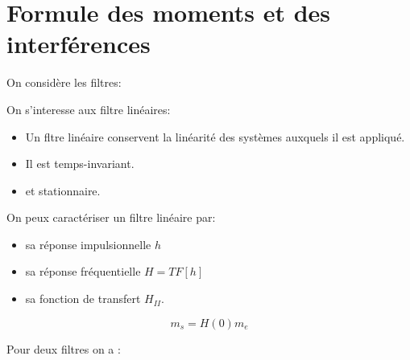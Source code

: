 \documentclass[main.tex]{subfiles}
\begin{document}
\section{Formule des moments et des interférences}
On considère les filtres:
{\huge
\begin{center}
\end{center}}

On s'interesse aux filtre linéaires:

\begin{defin}
    \begin{itemize}
    \item Un fltre linéaire conservent la linéarité des systèmes auxquels il est appliqué.
    \item  Il est temps-invariant.
    \item et stationnaire.
    \end{itemize}
    On peux caractériser un filtre linéaire par:
    \begin{itemize}
    \item sa réponse impulsionnelle $h$
    \item sa réponse fréquentielle $H= TF[h]$
    \item sa fonction de transfert $H_{II}$.
    \end{itemize}
\end{defin}

\begin{prop}[Moyenne]
  \[
m_s = H(0) m_e
  \]
\end{prop}

Pour deux filtres on a :
\begin{center}
  \\[1.5em]
\end{center}
\end{document}
